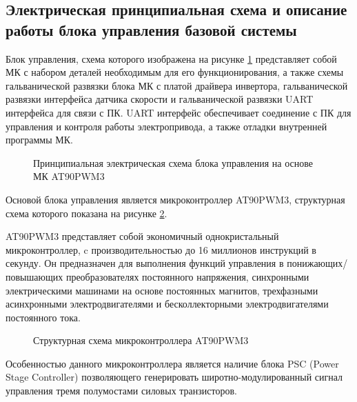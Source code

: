     \subsection{Электрическая принципиальная схема и описание работы блока
        управления базовой системы}

        Блок управления, схема которого изображена на рисунке
        \ref{fig:mcu-block-schematic} представляет собой МК с набором деталей
        необходимым для его функционирования, а также схемы гальванической
        развязки блока МК с платой драйвера  инвертора, гальванической развязки
        интерфейса датчика скорости и гальванической развязки UART интерфейса
        для связи с ПК.  UART интерфейс обеспечивает соединение с ПК для
        управления и контроля работы электропривода, а также отладки внутренней
        программы МК.
            
        \begin{figure}
            \caption{Принципиальная электрическая схема блока управления на
                основе МК AT90PWM3}
            \label{fig:mcu-block-schematic}
        \end{figure}
        
        Основой блока управления является микроконтроллер AT90PWM3, структурная
        схема которого показана на рисунке \ref{fig:at90pwm3}.
        
        AT90PWM3 представляет собой экономичный однокристальный
        микроконтроллер, c производительностью до 16 миллионов инструкций в
        секунду. Он предназначен для выполнения функций управления в
        понижающих/повышающих преобразователях постоянного напряжения,
        синхронными электрическими машинами на основе постоянных магнитов,
        трехфазными асинхронными электродвигателями и бесколлекторными
        электродвигателями постоянного тока. 

        \begin{figure}[h!]
            \caption{Структурная схема микроконтроллера AT90PWM3}
            \label{fig:at90pwm3}
        \end{figure}
        
        Особенностью данного микроконтроллера является наличие блока PSC (Power
        Stage Controller) позволяющего генерировать широтно-модулированный
        сигнал управления тремя полумостами силовых транзисторов. 
        
